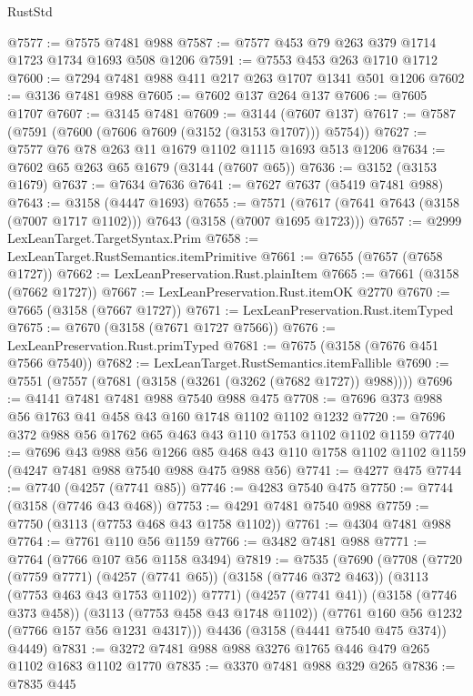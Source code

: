 \begin{lexlean}{RustStd}
\begin{coremodule}
@7577 := @7575 @7481 @988
@7587 := @7577 @453 @79 @263 @379 @1714 @1723 @1734 @1693 @508 @1206
@7591 := @7553 @453 @263 @1710 @1712
@7600 := @7294 @7481 @988 @411 @217 @263 @1707 @1341 @501 @1206
@7602 := @3136 @7481 @988
@7605 := @7602 @137 @264 @137
@7606 := @7605 @1707
@7607 := @3145 @7481
@7609 := @3144 (@7607 @137)
@7617 := @7587 (@7591 (@7600 (@7606 @7609 (@3152 (@3153 @1707))) @5754))
@7627 := @7577 @76 @78 @263 @11 @1679 @1102 @1115 @1693 @513 @1206
@7634 := @7602 @65 @263 @65 @1679 (@3144 (@7607 @65))
@7636 := @3152 (@3153 @1679)
@7637 := @7634 @7636
@7641 := @7627 @7637 (@5419 @7481 @988)
@7643 := @3158 (@4447 @1693)
@7655 := @7571 (@7617 (@7641 @7643 (@3158 (@7007 @1717 @1102))) @7643 (@3158 (@7007 @1695 @1723)))
@7657 := @2999 LexLeanTarget.TargetSyntax.Prim
@7658 := LexLeanTarget.RustSemantics.itemPrimitive
@7661 := @7655 (@7657 (@7658 @1727))
@7662 := LexLeanPreservation.Rust.plainItem
@7665 := @7661 (@3158 (@7662 @1727))
@7667 := LexLeanPreservation.Rust.itemOK @2770
@7670 := @7665 (@3158 (@7667 @1727))
@7671 := LexLeanPreservation.Rust.itemTyped
@7675 := @7670 (@3158 (@7671 @1727 @7566))
@7676 := LexLeanPreservation.Rust.primTyped
@7681 := @7675 (@3158 (@7676 @451 @7566 @7540))
@7682 := LexLeanTarget.RustSemantics.itemFallible
@7690 := @7551 (@7557 (@7681 (@3158 (@3261 (@3262 (@7682 @1727)) @988))))
@7696 := @4141 @7481 @7481 @988 @7540 @988 @475
@7708 := @7696 @373 @988 @56 @1763 @41 @458 @43 @160 @1748 @1102 @1102 @1232
@7720 := @7696 @372 @988 @56 @1762 @65 @463 @43 @110 @1753 @1102 @1102 @1159
@7740 := @7696
    @43
    @988
    @56
    @1266
    @85
    @468
    @43
    @110
    @1758
    @1102
    @1102
    @1159
    (@4247 @7481 @988 @7540 @988 @475 @988 @56)
@7741 := @4277 @475
@7744 := @7740 (@4257 (@7741 @85))
@7746 := @4283 @7540 @475
@7750 := @7744 (@3158 (@7746 @43 @468))
@7753 := @4291 @7481 @7540 @988
@7759 := @7750 (@3113 (@7753 @468 @43 @1758 @1102))
@7761 := @4304 @7481 @988
@7764 := @7761 @110 @56 @1159
@7766 := @3482 @7481 @988
@7771 := @7764 (@7766 @107 @56 @1158 @3494)
@7819 := @7535
    (@7690
      (@7708
        (@7720
          (@7759 @7771)
          (@4257 (@7741 @65))
          (@3158 (@7746 @372 @463))
          (@3113 (@7753 @463 @43 @1753 @1102))
          @7771)
        (@4257 (@7741 @41))
        (@3158 (@7746 @373 @458))
        (@3113 (@7753 @458 @43 @1748 @1102))
        (@7761 @160 @56 @1232 (@7766 @157 @56 @1231 @4317)))
      @4436
      (@3158 (@4441 @7540 @475 @374))
      @4449)
@7831 := @3272 @7481 @988 @988 @3276 @1765 @446 @479 @265 @1102 @1683 @1102 @1770
@7835 := @3370 @7481 @988 @329 @265
@7836 := @7835 @445

\end{coremodule}
\end{lexlean}
